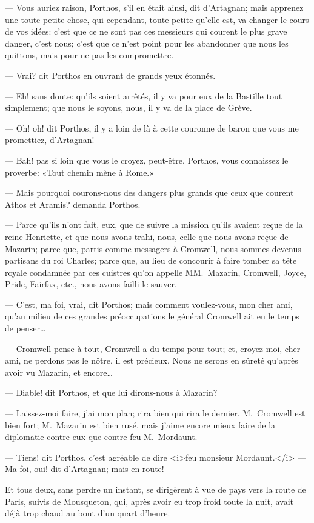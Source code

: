 — Vous auriez raison, Porthos, s'il en était ainsi, dit d'Artagnan; mais apprenez une toute petite chose, qui cependant, toute petite qu'elle est, va changer le cours de vos idées: c'est que ce ne sont pas ces messieurs qui courent le plus grave danger, c'est nous; c'est que ce n'est point pour les abandonner que nous les quittons, mais pour ne pas les compromettre.

— Vrai? dit Porthos en ouvrant de grands yeux étonnés.

— Eh! sans doute: qu'ils soient arrêtés, il y va pour eux de la Bastille tout simplement; que nous le soyons, nous, il y va de la place de Grève.

— Oh! oh! dit Porthos, il y a loin de là à cette couronne de baron que vous me promettiez, d'Artagnan!

— Bah! pas si loin que vous le croyez, peut-être, Porthos, vous connaissez le proverbe: «Tout chemin mène à Rome.»

— Mais pourquoi courons-nous des dangers plus grands que ceux que courent Athos et Aramis? demanda Porthos.

— Parce qu'ils n'ont fait, eux, que de suivre la mission qu'ils avaient reçue de la reine Henriette, et que nous avons trahi, nous, celle que nous avons reçue de Mazarin; parce que, partis comme messagers à Cromwell, nous sommes devenus partisans du roi Charles; parce que, au lieu de concourir à faire tomber sa tête royale condamnée par ces cuistres qu'on appelle MM.~Mazarin, Cromwell, Joyce, Pride, Fairfax, etc., nous avons failli le sauver.

— C'est, ma foi, vrai, dit Porthos; mais comment voulez-vous, mon cher ami, qu'au milieu de ces grandes préoccupations le général Cromwell ait eu le temps de penser\dots

— Cromwell pense à tout, Cromwell a du temps pour tout; et, croyez-moi, cher ami, ne perdons pas le nôtre, il est précieux. Nous ne serons en sûreté qu'après avoir vu Mazarin, et encore\dots

— Diable! dit Porthos, et que lui dirons-nous à Mazarin?

— Laissez-moi faire, j'ai mon plan; rira bien qui rira le dernier. M.~Cromwell est bien fort; M.~Mazarin est bien rusé, mais j'aime encore mieux faire de la diplomatie contre eux que contre feu M.~Mordaunt.

— Tiens! dit Porthos, c'est agréable de dire <i>feu monsieur Mordaunt.</i>
— Ma foi, oui! dit d'Artagnan; mais en route!

Et tous deux, sans perdre un instant, se dirigèrent à vue de pays vers la route de Paris, suivis de Mousqueton, qui, après avoir eu trop froid toute la nuit, avait déjà trop chaud au bout d'un quart d'heure.
